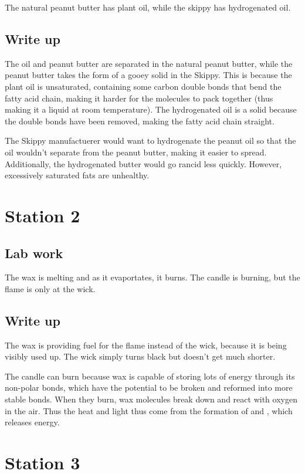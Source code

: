 \documentclass[12pt]{article}
\begin{document}
The natural peanut butter has plant oil, while the skippy has hydrogenated oil.

\subsection*{Write up}
The oil and peanut butter are separated in the natural peanut butter,
while the peanut butter takes the form of a gooey solid in the Skippy. 
This is because the plant oil is unsaturated, containing some carbon double
bonds that bend the fatty acid chain, making it harder for the molecules to
pack together (thus making it a liquid at room temperature). The hydrogenated oil is a solid 
because the double bonds have been removed, making the fatty acid chain straight.

The Skippy manufactuerer would want to hydrogenate the peanut oil 
so that the oil wouldn't separate from the peanut butter, making 
it easier to spread. Additionally, the hydrogenated butter would 
go rancid less quickly. However, excessively saturated fats are unhealthy. 

\section*{Station 2}
\subsection*{Lab work}
The wax is melting and as it evaportates, it burns. 
The candle is burning, but the flame is only at the wick. 

\subsection*{Write up}
The wax is providing fuel for the flame instead of the wick, because it is being 
visibly used up. The wick simply turns black but doesn't get much shorter.

The candle can burn because wax is capable of storing lots of energy
through its non-polar bonds, which have the potential to be broken
and reformed into more stable bonds. When they burn, wax molecules
break down and react with oxygen in the air. Thus
the heat and light thus come from the 
formation of  and , which releases energy.

\section*{Station 3}
\end{document}

